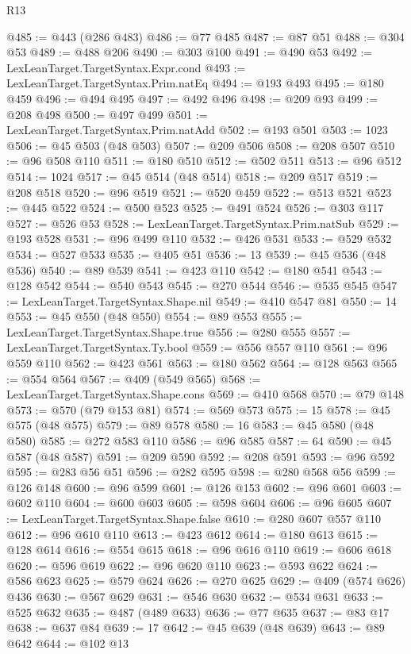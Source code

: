 \begin{lexlean}{R13}
\begin{coremodule}
{{{{{{{{{{{{{{{{{{{{{{{{{{{{{{{{{{{{{{{{{{{{{{{{{{{{{{{{{{{{{{{{{{{{{{{{{{{{{{{{{{{{{{{{{{{{{{{{{{{{{{{{{{@485 := @443 (@286 @483)
@486 := @77 @485
@487 := @87 @51
@488 := @304 @53
@489 := @488 @206
@490 := @303 @100
@491 := @490 @53
@492 := LexLeanTarget.TargetSyntax.Expr.cond
@493 := LexLeanTarget.TargetSyntax.Prim.natEq
@494 := @193 @493
@495 := @180 @459
@496 := @494 @495
@497 := @492 @496
@498 := @209 @93
@499 := @208 @498
@500 := @497 @499
@501 := LexLeanTarget.TargetSyntax.Prim.natAdd
@502 := @193 @501
@503 := 1023
@506 := @45 @503 (@48 @503)
@507 := @209 @506
@508 := @208 @507
@510 := @96 @508 @110
@511 := @180 @510
@512 := @502 @511
@513 := @96 @512
@514 := 1024
@517 := @45 @514 (@48 @514)
@518 := @209 @517
@519 := @208 @518
@520 := @96 @519
@521 := @520 @459
@522 := @513 @521
@523 := @445 @522
@524 := @500 @523
@525 := @491 @524
@526 := @303 @117
@527 := @526 @53
@528 := LexLeanTarget.TargetSyntax.Prim.natSub
@529 := @193 @528
@531 := @96 @499 @110
@532 := @426 @531
@533 := @529 @532
@534 := @527 @533
@535 := @405 @51
@536 := 13
@539 := @45 @536 (@48 @536)
@540 := @89 @539
@541 := @423 @110
@542 := @180 @541
@543 := @128 @542
@544 := @540 @543
@545 := @270 @544
@546 := @535 @545
@547 := LexLeanTarget.TargetSyntax.Shape.nil
@549 := @410 @547 @81
@550 := 14
@553 := @45 @550 (@48 @550)
@554 := @89 @553
@555 := LexLeanTarget.TargetSyntax.Shape.true
@556 := @280 @555
@557 := LexLeanTarget.TargetSyntax.Ty.bool
@559 := @556 @557 @110
@561 := @96 @559 @110
@562 := @423 @561
@563 := @180 @562
@564 := @128 @563
@565 := @554 @564
@567 := @409 (@549 @565)
@568 := LexLeanTarget.TargetSyntax.Shape.cons
@569 := @410 @568
@570 := @79 @148
@573 := @570 (@79 @153 @81)
@574 := @569 @573
@575 := 15
@578 := @45 @575 (@48 @575)
@579 := @89 @578
@580 := 16
@583 := @45 @580 (@48 @580)
@585 := @272 @583 @110
@586 := @96 @585
@587 := 64
@590 := @45 @587 (@48 @587)
@591 := @209 @590
@592 := @208 @591
@593 := @96 @592
@595 := @283 @56 @51
@596 := @282 @595
@598 := @280 @568 @56
@599 := @126 @148
@600 := @96 @599
@601 := @126 @153
@602 := @96 @601
@603 := @602 @110
@604 := @600 @603
@605 := @598 @604
@606 := @96 @605
@607 := LexLeanTarget.TargetSyntax.Shape.false
@610 := @280 @607 @557 @110
@612 := @96 @610 @110
@613 := @423 @612
@614 := @180 @613
@615 := @128 @614
@616 := @554 @615
@618 := @96 @616 @110
@619 := @606 @618
@620 := @596 @619
@622 := @96 @620 @110
@623 := @593 @622
@624 := @586 @623
@625 := @579 @624
@626 := @270 @625
@629 := @409 (@574 @626) @436
@630 := @567 @629
@631 := @546 @630
@632 := @534 @631
@633 := @525 @632
@635 := @487 (@489 @633)
@636 := @77 @635
@637 := @83 @17
@638 := @637 @84
@639 := 17
@642 := @45 @639 (@48 @639)
@643 := @89 @642
@644 := @102 @13
}}}}}}}}}}}}}}}}}}}}}}}}}}}}}}}}}}}}}}}}}}}}}}}}}}}}}}}}}}}}}}}}}}}}}}}}}}}}}}}}}}}}}}}}}}}}}}}}}}}}}}}}}}
\end{coremodule}
\end{lexlean}
